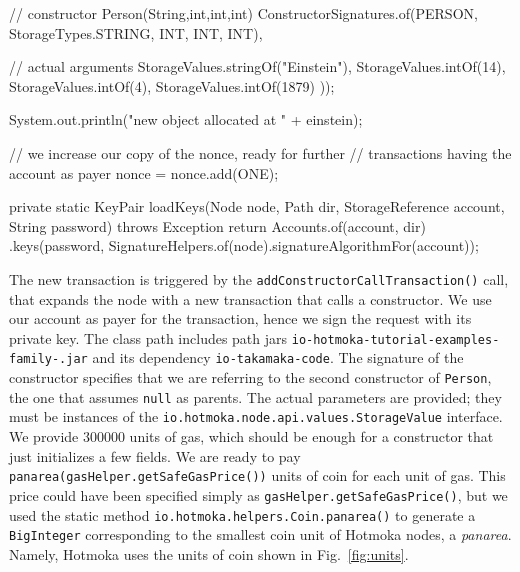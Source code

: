 \begin{codebox}
\begin{javalst}
{{{      // constructor Person(String,int,int,int)
      ConstructorSignatures.of(PERSON, StorageTypes.STRING, INT, INT, INT),

      // actual arguments
      StorageValues.stringOf("Einstein"), StorageValues.intOf(14),
      StorageValues.intOf(4), StorageValues.intOf(1879)
      ));

      System.out.println("new object allocated at " + einstein);

      // we increase our copy of the nonce, ready for further
      // transactions having the account as payer
      nonce = nonce.add(ONE);
    }
  }

  private static KeyPair loadKeys(Node node, Path dir, StorageReference account, String password) throws Exception {
    return Accounts.of(account, dir)
    .keys(password, SignatureHelpers.of(node).signatureAlgorithmFor(account));
  }
}
\end{javalst}\end{codebox}
%
The new transaction is triggered by the
\texttt{addConstructorCallTransaction()} call,
that expands the node with a new transaction that calls
a constructor. We use our account as payer for the transaction, hence we sign
the request with its private key.
The class path includes path jars
\texttt{io-hotmoka-tutorial-examples-family-\hotmokaVersion{}.jar}
and its dependency \texttt{io-takamaka-code}.
The signature of the constructor specifies that we are referring to the second
constructor of \texttt{Person}, the one that assumes \texttt{null} as parents.
The actual parameters
are provided; they must be instances of the \texttt{io.hotmoka.node.api.values.StorageValue}
interface.
We provide $300000$ units of gas, which should be enough for a constructor
that just initializes a few fields.
We are ready to pay \texttt{panarea(gasHelper.getSafeGasPrice())}
units of coin for each unit of gas.
This price could have been specified simply as \texttt{gasHelper.getSafeGasPrice()},
but we used the static method \texttt{io.hotmoka.helpers.Coin.panarea()}
to generate a \texttt{BigInteger} corresponding to the smallest coin unit of Hotmoka nodes,
a \emph{panarea}.
Namely, Hotmoka uses the units of coin shown in Fig.~\ref{fig:units}.
%
